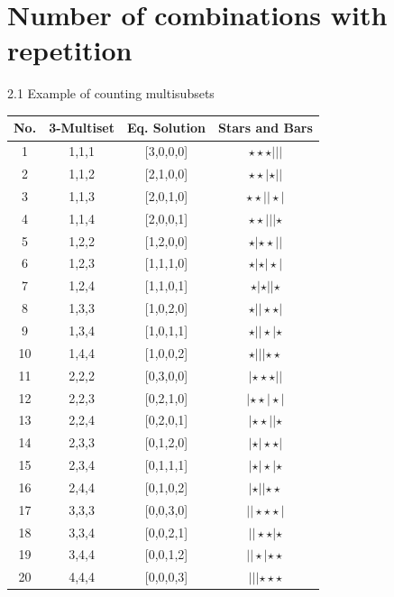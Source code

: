 \documentclass[12pt]{article}
\begin{document}
\section{Number of combinations with repetition}
{\large  2.1 Example of counting multisubsets}

\begin{table}[h]
\centering
\begin{tabular}{|c|c|c|c|}
\hline
No. & 3-Multiset & Eq. Solution & Stars and Bars \\
\hline
1&{1,1,1} &[3,0,0,0]&$\star \star \star |||$\\
\hline
2 &{1,1,2} &[2,1,0,0] &$\star \star |\star ||$\\
\hline
3&	{1,1,3}&	[2,0,1,0]&	$\star \star ||\star |$\\
\hline
4&	{1,1,4}&	[2,0,0,1]&	$\star \star |||\star$ \\
\hline
5&	{1,2,2}&	[1,2,0,0]&	$\star |\star \star ||$\\
\hline
6&	{1,2,3}&	[1,1,1,0]&	$\star |\star |\star |$\\
\hline
7&	{1,2,4}&	[1,1,0,1]&	$\star |\star ||\star$ \\
\hline
8&	{1,3,3}&	[1,0,2,0]&	$\star ||\star \star |$\\
\hline
9&	{1,3,4}&	[1,0,1,1]& $\star ||\star |\star$ \\
\hline
10&	{1,4,4}&	[1,0,0,2]&	$\star |||\star \star$ \\
\hline
11&	{2,2,2}&	[0,3,0,0]&	$|\star \star \star ||$\\
\hline
12&	{2,2,3}&	[0,2,1,0]&	$|\star \star |\star |$\\
\hline
13&	{2,2,4}&	[0,2,0,1]&	$|\star \star ||\star$ \\
\hline
14&	{2,3,3}&	[0,1,2,0]&	$|\star |\star \star |$\\
\hline
15&	{2,3,4}&	[0,1,1,1]&	$|\star |\star |\star$ \\
\hline
16&	{2,4,4}&	[0,1,0,2]&	$|\star ||\star \star$ \\
\hline
17&	{3,3,3}&	[0,0,3,0]&	$||\star \star \star |$\\
\hline
18&	{3,3,4}&	[0,0,2,1]&	$||\star \star |\star$ \\
\hline
19&	{3,4,4} &	[0,0,1,2]&	$||\star |\star \star$ \\
\hline 
20 &	{4,4,4} &	[0,0,0,3] &$|||\star \star \star$ \\
\hline
\end{tabular}
\end{table}
\end{document}
